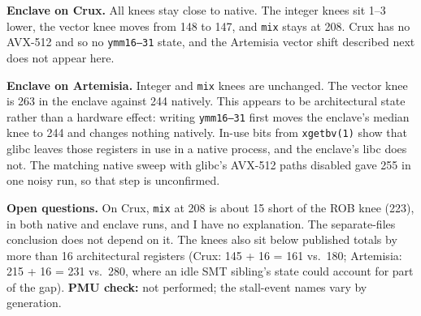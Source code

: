 \documentclass[10pt]{article}
\newcommand{\code}[1]{\texttt{#1}}
\begin{document}
\textbf{Enclave on Crux.} All knees stay close to native. The integer knees sit 1--3 lower, the vector knee moves from 148 to 147, and \code{mix} stays at 208. Crux has no AVX-512 and so no \code{ymm16--31} state, and the Artemisia vector shift described next does not appear here.

\textbf{Enclave on Artemisia.} Integer and \code{mix} knees are unchanged. The vector knee is 263 in the enclave against 244 natively. This appears to be architectural state rather than a hardware effect: writing \code{ymm16--31} first moves the enclave's median knee to 244 and changes nothing natively. In-use bits
from \code{xgetbv(1)} show that glibc leaves those registers in use in a native process, and the enclave's libc does not.
The matching native sweep with glibc's AVX-512 paths disabled gave 255 in one noisy run, so that step is unconfirmed.

\textbf{Open questions.} On Crux, \code{mix} at 208 is about 15 short of the ROB knee (223), in both native and enclave runs, and I have no explanation. The separate-files conclusion
does not depend on it. The knees also sit below published totals by more than 16 architectural registers (Crux: 145 + 16 = 161 vs.\ 180; Artemisia: 215 + 16 = 231 vs.\ 280, where an idle SMT
sibling's state could account for part of the gap).
\textbf{PMU check:} not performed; the stall-event names vary by generation.
\end{document}
